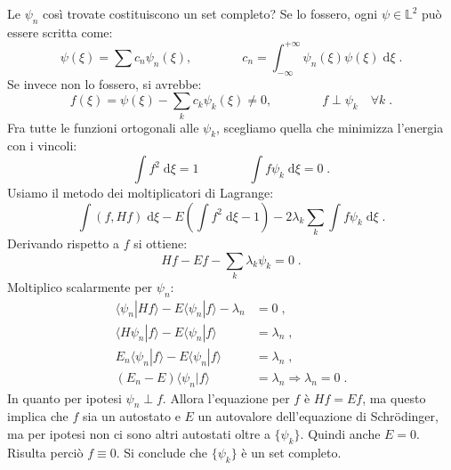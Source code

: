 \documentclass[10pt,a4paper]{report}
\theoremstyle{definition}
\numberwithin{equation}{section}
\newcommand{\diff}[1][]{\mathrm{d}#1}
\newcommand{\bra}{\langle}
\newcommand{\ket}{\rangle}
\newcommand{\Sch}{Schrödinger}
\begin{document}
Le $\psi_n$ così trovate costituiscono un set completo? Se lo fossero, ogni $\psi\in\mathbb{L}^2$ può essere scritta come:
$$
\psi(\xi)=\sum c_n\psi_n(\xi), \qquad\qquad c_n=\int_{-\infty}^{+\infty}\psi_n(\xi)\psi(\xi)\;\diff{\xi}\;.
$$
Se invece non lo fossero, si avrebbe:
\begin{equation}
f(\xi)=\psi(\xi)-\sum_k c_k\psi_k(\xi)\ne 0,\qquad\qquad f\perp\psi_k\quad\forall k\;.
\end{equation}
Fra tutte le funzioni ortogonali alle $\psi_k$, scegliamo quella che minimizza l'energia con i vincoli:
$$
\int f^2\;\diff{\xi}=1 \qquad\qquad \int f\psi_k\;\diff{\xi}=0\;.
$$
Usiamo il metodo dei moltiplicatori di Lagrange:
\begin{equation}
\int (f,Hf)\;\diff{\xi}-E\left(\int f^2\;\diff{\xi} -1\right)-2\lambda_k\sum_k\int f\psi_k\;\diff{\xi}\;.
\end{equation}
Derivando rispetto a $f$ si ottiene:
\begin{equation}
Hf-Ef-\sum_k\lambda_k\psi_k=0\;.
\end{equation}
Moltiplico scalarmente per $\psi_n$:
\begin{align*}
\bra\psi_n|Hf\ket-E\bra\psi_n|f\ket-\lambda_n &= 0\;, \\
\bra H\psi_n|f\ket-E\bra\psi_n|f\ket &=\lambda_n\;, \\
E_n\bra\psi_n|f\ket-E\bra\psi_n|f\ket &= \lambda_n\;, \\
(E_n-E)\bra\psi_n|f\ket &=\lambda_n \Longrightarrow \lambda_n=0\;.
\end{align*}
In quanto per ipotesi $\psi_n\perp f$. Allora l'equazione per $f$ è $Hf=Ef$, ma questo implica che $f$ sia un autostato e $E$ un autovalore dell'equazione di \Sch, ma per ipotesi non ci sono altri autostati oltre a $\{\psi_k\}$. Quindi anche $E=0$. Risulta perciò $f\equiv 0$. Si conclude che $\{\psi_k\}$ è un set completo.
\end{document}
